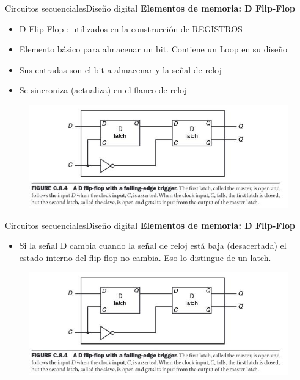 \documentclass[aspectratio=169,compress]{beamer}
\begin{document}
\begin{footnotesize}
\begin{frame}{Circuitos secuenciales}{Diseño digital}
\bigskip
\textbf{Elementos de memoria: D Flip-Flop}
\begin{itemize}
\item D Flip-Flop : utilizados en la construcción de REGISTROS
\item Elemento básico para almacenar un bit. Contiene un Loop en su diseño
\item Sus entradas son el bit a almacenar y la señal de reloj
\item Se sincroniza (actualiza) en el flanco de reloj
\end{itemize}
\bigskip
\begin{figure}
\includegraphics[scale=0.4]{images/flip-flop-d.jpg} 
\end{figure}
\end{frame}

\begin{frame}{Circuitos secuenciales}{Diseño digital}
\bigskip
\textbf{Elementos de memoria: D Flip-Flop}
\begin{itemize}
\item Si la señal D cambia cuando la señal de reloj está baja (desacertada)
el estado interno del flip-flop no cambia. Eso lo distingue de un latch.
\end{itemize}
\bigskip
\begin{figure}
\includegraphics[scale=0.4]{images/flip-flop-d.jpg} 
\end{figure}
\end{frame}


\end{footnotesize}
\end{document}
